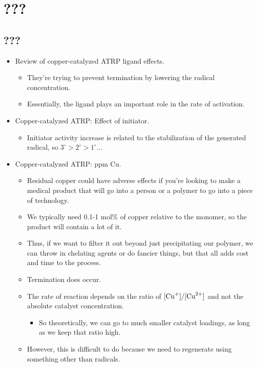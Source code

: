 \documentclass[../notes.tex]{subfiles}
\begin{document}
\chapter{???}
\section{???}
\begin{itemize}
    \item {}Review of copper-catalyzed ATRP ligand effects.
    \begin{itemize}
        \item They're trying to prevent termination by lowering the radical concentration.
        \item Essentially, the ligand plays an important role in the rate of activation.
    \end{itemize}
    \item Copper-catalyzed ATRP: Effect of initiator.
    \begin{itemize}
        \item Initiator activity increase is related to the stabilization of the generated radical, so $3^\circ>2^\circ>1^\circ$...
    \end{itemize}
    \item Copper-catalyzed ATRP: ppm Cu.
    \begin{itemize}
        \item Residual copper could have adverse effects if you're looking to make a medical product that will go into a person or a polymer to go into a piece of technology.
        \item We typically need 0.1-1 mol\% of copper relative to the monomer, so the product will contain a lot of it.
        \item Thus, if we want to filter it out beyond just precipitating our polymer, we can throw in chelating agents or do fancier things, but that all adds cost and time to the process.
        \item Termination does occur.
        \item The rate of reaction depends on the ratio of $[\ce{Cu^+}]/[\ce{Cu^2+}]$ and not the absolute catalyst concentration.
        \begin{itemize}
            \item So theoretically, we can go to much smaller catalyst loadings, as long as we keep that ratio high.
        \end{itemize}
        \item However, this is difficult to do because we need to regenerate  using something other than radicals.

\end{itemize}
\end{itemize}
\end{document}
